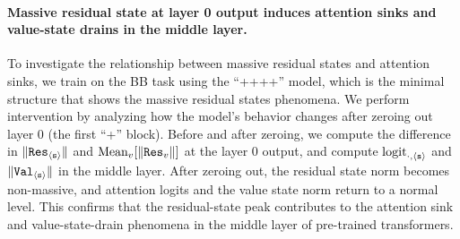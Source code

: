 


\paragraph{Massive residual state at layer 0 output induces attention sinks and value-state drains in the middle layer.} To investigate the relationship between massive residual states and attention sinks, we train on the BB task using the ``\attn+\mlp+\attn+\mlp+\mlp'' model, which is the minimal structure that shows the massive residual states phenomena. We perform intervention by analyzing how the model's behavior changes after zeroing out layer 0 (the first ``\attn+\mlp'' block). Before and after zeroing, we compute the difference in $\|{\tt Res}_{\texttt{$\langle \texttt{s}\rangle$}}\|$ and $\text{Mean}_v[\|{\tt Res}_v\|]$ at the layer 0 output, and compute $\text{logit}_{\cdot,\texttt{$\langle \texttt{s}\rangle$}}$ and $\|{\tt Val}_{\texttt{$\langle \texttt{s}\rangle$}}\|$ in the middle layer. After zeroing out, the residual state norm becomes non-massive, and attention logits and the value state norm return to a normal level. This confirms that the residual-state peak contributes to the attention sink and value-state-drain phenomena in the middle layer of pre-trained transformers. 


